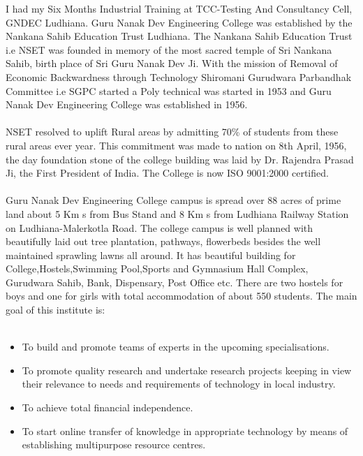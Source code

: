 \hspace{-1.7em} I had my Six Months Industrial Training at TCC-Testing And Consultancy Cell, GNDEC Ludhiana. Guru Nanak Dev Engineering College was established by the Nankana
Sahib Education Trust Ludhiana. The Nankana Sahib Education Trust i.e NSET
was founded in memory of the most sacred temple of Sri Nankana Sahib, birth place
of Sri Guru Nanak Dev Ji. With the mission of Removal of Economic Backwardness
through Technology Shiromani Gurudwara Parbandhak Committee i.e SGPC started a
Poly technical was started in 1953 and Guru Nanak Dev Engineering College was established in 1956.\\\\
NSET resolved to uplift Rural areas by admitting 70\% 
of students from these rural
areas ever year. This commitment was made to nation on 8th April, 1956, the day
foundation stone of the college building was laid by Dr. Rajendra Prasad Ji, the First
President of India. The College is now ISO 9001:2000 certified.\\\\
Guru Nanak Dev Engineering College campus is spread over 88 acres of prime land
about 5 Km s from Bus Stand and 8 Km s from Ludhiana Railway Station on Ludhiana-Malerkotla Road. The college campus is well planned with beautifully laid out tree plantation, pathways, flowerbeds besides the well maintained sprawling lawns all around. It
has beautiful building for College,Hostels,Swimming Pool,Sports and Gymnasium Hall
Complex, Gurudwara Sahib, Bank, Dispensary, Post Office etc. There are two hostels
for boys and one for girls with total accommodation of about 550 students. The main
goal of this institute is:\\\\
\begin{itemize}
\item To build and promote teams of experts in the upcoming specialisations.
\item To promote quality research and undertake research projects keeping in view their
relevance to needs and requirements of technology in local industry.
\item To achieve total financial independence.
\item To start online transfer of knowledge in appropriate technology by means of establishing multipurpose resource centres.
\end{itemize}
